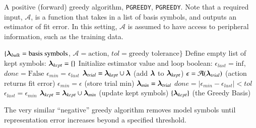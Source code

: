 \documentclass[twocolumn,aps,prd,floatfix,preprintnumbers,a4paper,nofootinbib,
superscriptaddress,10pt]{revtex4-1}
\def\pgreedy{\texttt{PGREEDY}}
\begin{document}
{\scriptsize
\begin{algorithm}[H]
  \caption{A positive (forward) greedy algorithm, \pgreedy{}, \texttt{PGREEDY}. Note that a required input, $\mathcal{A}$, is a function that takes in a list of basis symbols, and outputs an estimator of fit error. In this setting, $\mathcal{A}$ is assumed to have access to peripheral information, such as the training data.}
  \label{alg:pgreedy}
  \begin{algorithmic}[1]
     $ \{ {\bm{\lambda}}_{bulk} = \text{basis symbols}$, $\mathcal{A} = \text{action}$, $tol=\text{greedy tolerance}\}$
    \vskip 10pt
    \State Define empty list of kept symbols: ${\bm{\lambda}}_{kept} = \{\}$
    \State Initialize estimator value and loop boolean: $\epsilon_{last} = \mathrm{inf}$, $done = \text{False}$
      \State $\epsilon_{min} = \epsilon_{last}$
        \State ${\bm{\lambda}}_{trial} = {\bm{\lambda}}_{kept} \cup {\bm{\lambda}}$ {\hskip0.525in} (add ${\bm{\lambda}}$ to ${\bm{\lambda}}_{kept}$)
        \State $\epsilon = \mathcal{A}({\bm{\lambda}}_{trial})$ {\hskip0.70in} (action returns fit error)
          \State $\epsilon_{min} = \epsilon$  {\hskip0.825in} (store trial min)
          \State ${\bm{\lambda}}_{min} = {\bm{\lambda}}_{trial}$
        \EndIf
      \EndFor
      \State $done = |\epsilon_{min}-\epsilon_{last}|<tol$ %
        \State $\epsilon_{last} = \epsilon_{min}$
        \State ${\bm{\lambda}}_{kept} = {\bm{\lambda}}_{kept} \cup {\bm{\lambda}}_{min}$ {\hskip0.4in} (update kept symbols)
      \EndIf
    \EndWhile
    \vskip 10pt
     $\{ {\bm{\lambda}}_{kept} \}$ (the Greedy Basis)
  \end{algorithmic}
\end{algorithm}
}
%
\par The very similar ``negative'' greedy algorithm removes model symbols until representation error increases beyond a specified threshold.
%
%
%
%
\end{document}
